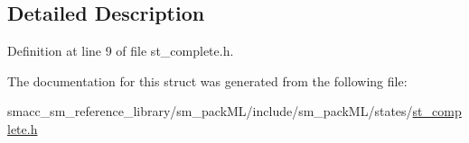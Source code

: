 \subsection{Detailed Description}


Definition at line 9 of file st\+\_\+complete.\+h.



The documentation for this struct was generated from the following file\+:\begin{DoxyCompactItemize}
\item 
smacc\+\_\+sm\+\_\+reference\+\_\+library/sm\+\_\+pack\+M\+L/include/sm\+\_\+pack\+M\+L/states/\hyperlink{st__complete_8h}{st\+\_\+complete.\+h}\end{DoxyCompactItemize}
